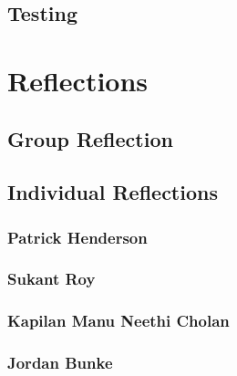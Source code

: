 \documentclass[11pt]{article}
\begin{document}
\subsection{Testing}

\section{Reflections}

\subsection{Group Reflection}

\subsection{Individual Reflections}

\subsubsection{Patrick Henderson}

\subsubsection{Sukant Roy}

\subsubsection{Kapilan Manu Neethi Cholan}

\subsubsection{Jordan Bunke}
\end{document}
